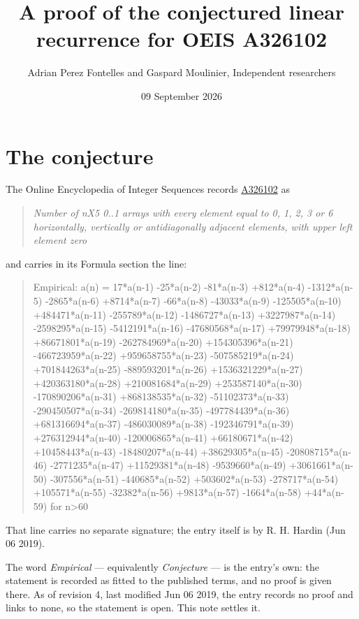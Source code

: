 \documentclass[11pt]{article}
\title{A proof of the conjectured linear recurrence for OEIS A326102}
\author{Adrian Perez Fontelles and Gaspard Moulinier, Independent researchers}
\date{09 September 2026}
\theoremstyle{definition}
\begin{document}
\maketitle
\section{The conjecture}

The Online Encyclopedia of Integer Sequences records \href{https://oeis.org/A326102}{A326102} as

\begin{quote}\itshape Number of nX5 0..1 arrays with every element equal to 0, 1, 2, 3 or 6 horizontally, vertically or antidiagonally adjacent elements, with upper left element zero\end{quote}

and carries in its Formula section the line:

\begin{quote}\ttfamily Empirical: a(n) = 17*a(n-1) -25*a(n-2) -81*a(n-3) +812*a(n-4) -1312*a(n-5) -2865*a(n-6) +8714*a(n-7) -66*a(n-8) -43033*a(n-9) -125505*a(n-10) +484471*a(n-11) -255789*a(n-12) -1486727*a(n-13) +3227987*a(n-14) -2598295*a(n-15) -5412191*a(n-16) -47680568*a(n-17) +79979948*a(n-18) +86671801*a(n-19) -262784969*a(n-20) +154305396*a(n-21) -466723959*a(n-22) +959658755*a(n-23) -507585219*a(n-24) +701844263*a(n-25) -889593201*a(n-26) +1536321229*a(n-27) +420363180*a(n-28) +210081684*a(n-29) +253587140*a(n-30) -170890206*a(n-31) +868138535*a(n-32) -51102373*a(n-33) -290450507*a(n-34) -269814180*a(n-35) -497784439*a(n-36) +681316694*a(n-37) -486030089*a(n-38) -192346791*a(n-39) +276312944*a(n-40) -120006865*a(n-41) +66180671*a(n-42) +10458443*a(n-43) -18480207*a(n-44) +38629305*a(n-45) -20808715*a(n-46) -2771235*a(n-47) +11529381*a(n-48) -9539660*a(n-49) +3061661*a(n-50) -307556*a(n-51) -440685*a(n-52) +503602*a(n-53) -278717*a(n-54) +105571*a(n-55) -32382*a(n-56) +9813*a(n-57) -1664*a(n-58) +44*a(n-59) for n>60\end{quote}

That line carries no separate signature; the entry itself is by R. H. Hardin (Jun 06 2019).

The word {\itshape Empirical} --- equivalently {\itshape Conjecture} --- is the entry's own: the statement is recorded as fitted to the published terms, and no proof is given there. As of revision 4, last modified Jun 06 2019, the entry records no proof and links to none, so the statement is open. This note settles it.
\end{document}
